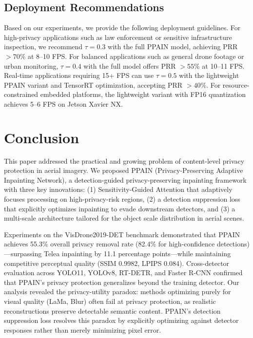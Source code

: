 \documentclass[preprint,12pt]{elsarticle}
\begin{document}
\subsection{Deployment Recommendations}

Based on our experiments, we provide the following deployment guidelines. For high-privacy applications such as law enforcement or sensitive infrastructure inspection, we recommend $\tau = 0.3$ with the full PPAIN model, achieving PRR $> 70\%$ at 8--10 FPS. For balanced applications such as general drone footage or urban monitoring, $\tau = 0.4$ with the full model offers PRR $> 55\%$ at 10--11 FPS. Real-time applications requiring 15+ FPS can use $\tau = 0.5$ with the lightweight PPAIN variant and TensorRT optimization, accepting PRR $> 40\%$. For resource-constrained embedded platforms, the lightweight variant with FP16 quantization achieves 5--6 FPS on Jetson Xavier NX.


\section{Conclusion}
\label{sec:conclusion}

This paper addressed the practical and growing problem of content-level privacy protection in aerial imagery. We proposed PPAIN (Privacy-Preserving Adaptive Inpainting Network), a detection-guided privacy-preserving inpainting framework with three key innovations: (1) Sensitivity-Guided Attention that adaptively focuses processing on high-privacy-risk regions, (2) a detection suppression loss that explicitly optimizes inpainting to evade downstream detectors, and (3) a multi-scale architecture tailored for the object scale distribution in aerial scenes.

Experiments on the VisDrone2019-DET benchmark demonstrated that PPAIN achieves 55.3\% overall privacy removal rate (82.4\% for high-confidence detections)---surpassing Telea inpainting by 11.1 percentage points---while maintaining competitive perceptual quality (SSIM 0.9982, LPIPS 0.084). Cross-detector evaluation across YOLO11, YOLOv8, RT-DETR, and Faster R-CNN confirmed that PPAIN's privacy protection generalizes beyond the training detector. Our analysis revealed the privacy-utility paradox: methods optimizing purely for visual quality (LaMa, Blur) often fail at privacy protection, as realistic reconstructions preserve detectable semantic content. PPAIN's detection suppression loss resolves this paradox by explicitly optimizing against detector responses rather than merely minimizing pixel error.
\end{document}

